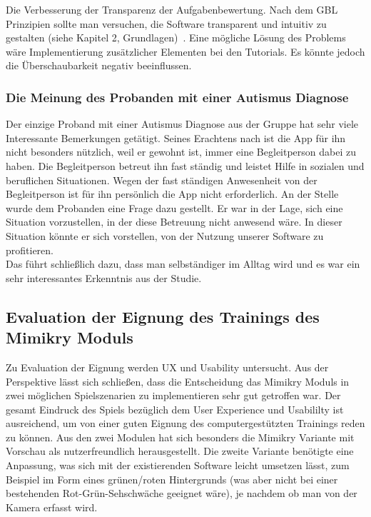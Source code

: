 Die Verbesserung der Transparenz der Aufgabenbewertung. Nach dem GBL Prinzipien sollte man versuchen, die Software transparent und intuitiv zu gestalten (siehe Kapitel 2, Grundlagen)~\cite{Prensky2003DigitalGL}. Eine mögliche Lösung des Problems wäre Implementierung zusätzlicher Elementen bei den Tutorials. Es könnte jedoch die Überschaubarkeit negativ beeinflussen.

\subsubsection{Die Meinung des Probanden mit einer Autismus Diagnose}
Der einzige Proband mit einer Autismus Diagnose aus der Gruppe hat sehr viele Interessante Bemerkungen getätigt. Seines Erachtens nach ist die App für ihn nicht besonders nützlich, weil er gewohnt ist, immer eine Begleitperson dabei zu haben. Die Begleitperson betreut ihn fast ständig und leistet Hilfe in sozialen und beruflichen Situationen. Wegen der fast ständigen Anwesenheit von der Begleitperson ist für ihn persönlich die App nicht erforderlich. An der Stelle wurde dem Probanden eine Frage dazu gestellt. Er war in der Lage, sich eine Situation vorzustellen, in der diese Betreuung nicht anwesend wäre. In dieser Situation könnte er sich vorstellen, von der Nutzung unserer Software zu profitieren.\\
Das führt schließlich dazu, dass man selbständiger im Alltag wird und es war ein sehr interessantes Erkenntnis aus der Studie.

\subsection{Evaluation der Eignung des Trainings des Mimikry Moduls}
Zu Evaluation der Eignung werden UX und Usability untersucht.
Aus der Perspektive lässt sich schließen, dass die Entscheidung das Mimikry Moduls in zwei möglichen Spielszenarien zu implementieren sehr gut getroffen war.  
Der gesamt Eindruck des Spiels bezüglich dem User Experience und Usabililty ist ausreichend, um von einer guten Eignung des computergestützten Trainings reden zu können. Aus den zwei Modulen hat sich besonders die Mimikry Variante mit Vorschau als nutzerfreundlich herausgestellt. Die zweite Variante benötigte eine Anpassung, was sich mit der existierenden Software leicht umsetzen lässt, zum Beispiel im Form eines grünen/roten Hintergrunds (was aber nicht  bei einer bestehenden Rot-Grün-Sehschwäche geeignet wäre), je nachdem ob man von der Kamera erfasst wird.



